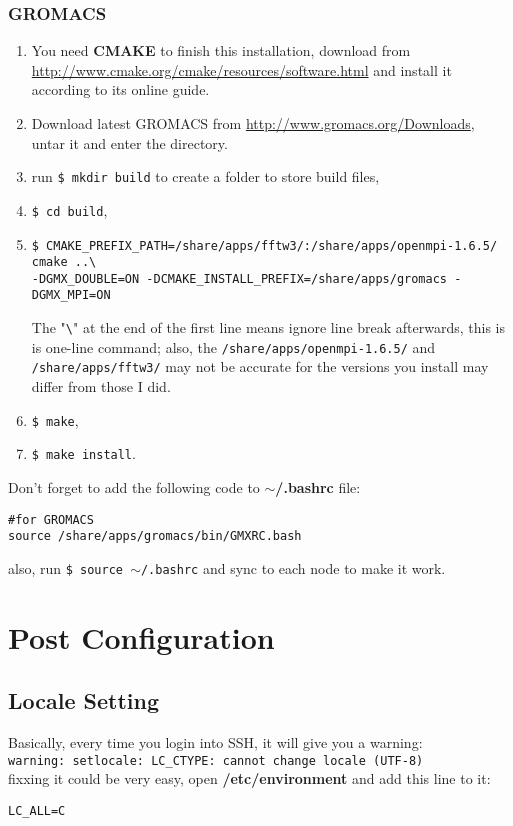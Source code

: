 \subsubsection{GROMACS}
\begin{enumerate}
\item You need {\bf CMAKE } to finish this installation, download from \url{http://www.cmake.org/cmake/resources/software.html} and install it according to its online guide.
\item Download latest GROMACS from \url{http://www.gromacs.org/Downloads}, untar it and enter the directory.
\item run {\tt \$ mkdir build} to create a folder to store build files,
\item {\tt \$ cd build},
\item 
\begin{lstlisting}[basicstyle=\ttfamily\scriptsize,columns=fullflexible]
$ CMAKE_PREFIX_PATH=/share/apps/fftw3/:/share/apps/openmpi-1.6.5/ cmake ..\
-DGMX_DOUBLE=ON -DCMAKE_INSTALL_PREFIX=/share/apps/gromacs -DGMX_MPI=ON
\end{lstlisting}
\begin{remark}
The "{\tt \textbackslash}" at the end of the first line means ignore line break afterwards, this is is one-line command;
also, the {\tt /share/apps/openmpi-1.6.5/} and {\tt /share/apps/fftw3/} may not be accurate for the versions you install may differ from those I did.
\end{remark}
\item {\tt \$ make},
\item {\tt \$ make install}.
\end{enumerate}
Don't forget to add the following code to {\bf $\sim$/.bashrc} file:
\begin{lstlisting}[basicstyle=\ttfamily\scriptsize,columns=fullflexible]
#for GROMACS
source /share/apps/gromacs/bin/GMXRC.bash
\end{lstlisting}
also, run {\tt \$ source $\sim$/.bashrc} and sync to each node to make it work. 
\section{Post Configuration}
\subsection{Locale Setting}
Basically, every time you login into SSH, it will give you a warning: \\ 
{\tt warning: setlocale: LC\_CTYPE: cannot change locale (UTF-8) } \\
fixxing it could be very easy, open {\bf /etc/environment } and add this line to it:
\begin{lstlisting}
LC_ALL=C
\end{lstlisting}